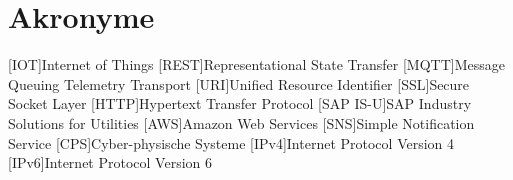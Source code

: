 \section*{Akronyme}            %
\begin{acronym}[SAP IS-U]
  [IOT]{Internet of Things}
  [REST]{Representational State Transfer}
  [MQTT]{Message Queuing Telemetry Transport}
  [URI]{Unified Resource Identifier}
  [SSL]{Secure Socket Layer}
  [HTTP]{Hypertext Transfer Protocol}
  [SAP IS-U]{SAP Industry Solutions for Utilities}
  [AWS]{Amazon Web Services}
  [SNS]{Simple Notification Service}
  [CPS]{Cyber-physische Systeme}
  [IPv4]{Internet Protocol Version 4}
  [IPv6]{Internet Protocol Version 6}


\end{acronym}

\newpage

\listoffigures
{}
\listoftables
{}
\lstlistoflistings
{}
\newpage
